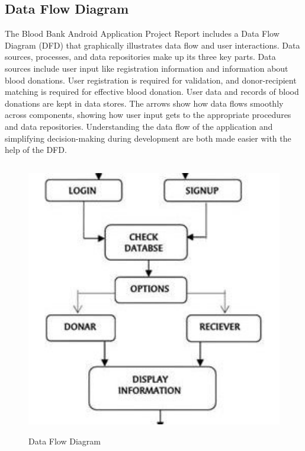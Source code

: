 \subsection{Data Flow Diagram}
The Blood Bank Android Application Project Report includes a Data Flow Diagram (DFD) that graphically illustrates data flow and user interactions. Data sources, processes, and data repositories make up its three key parts. Data sources include user input like registration information and information about blood donations. User registration is required for validation, and donor-recipient matching is required for effective blood donation. User data and records of blood donations are kept in data stores. The arrows show how data flows smoothly across components, showing how user input gets to the appropriate procedures and data repositories. Understanding the data flow of the application and simplifying decision-making during development are both made easier with the help of the DFD.

\begin{figure}[h]
    \centering
    \includegraphics[height=12cm]{img/dfd.jpg}
    \caption{Data Flow Diagram}
    \label{fig:enter-label}
\end{figure}

